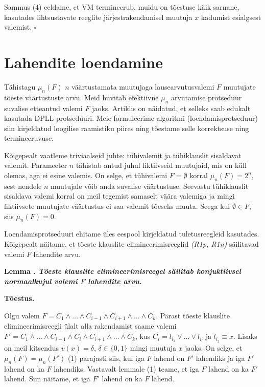 \documentclass[12pt,estonian]{report}
\newcounter{lemma_counter}\setcounter{lemma_counter}{1}
\newcommand{\lemma}[1]{
	\hspace{1cm}\textbf{Lemma \arabic{lemma_counter}\stepcounter{lemma_counter}. \textit{#1}}
}
\newcommand{\proof}[0]{
	\hspace{1cm}\textbf{Tõestus.}
}
\newcommand{\proofend}[0]{\(\square\)}
\newcommand{\proc}[1]{\textsf{#1}}
\begin{document}
Sammus (4) eeldame, et \proc{VM} termineerub, muidu on tõestuse käik
sarnane, kasutades lihtsustavate reeglite järjestrakendamisel muutuja
$x$ kadumist esialgsest valemist. \proofend


\chapter{Lahendite loendamine}

Tähistagu $\mu_{n}(F)$ $n$ väärtustamata muutujaga lausearvutusvalemi $F$ muutujate
tõeste väärtustuste arvu. Meid huvitab efektiivne $\mu_{n}$ arvutamise
protseduur suvalise etteantud valemi $F$ jaoks. Artiklis \cite{key-4}
on näidatud, et selleks saab edukalt kasutada DPLL protseduuri. Meie
formuleerime algoritmi (loendamisprotseduur) siin kirjeldatud loogilise
raamistiku piires ning tõestame selle korrektsuse ning termineeruvuse.

Kõigepealt vaatleme triviaalseid juhte: tühivalemit ja tühiklauslit
sisaldavat valemit. Parameeter $n$ tähistab antud juhul fiktiivseid
muutujaid, mis on küll olemas, aga ei esine valemis. On selge, et
tühivalemi $F=\emptyset$ korral $\mu_{n}(F)={2}^{n}$, sest nendele
$n$ muutujale võib anda suvalise väärtustuse. Seevastu tühiklauslit sisaldava valemi
korral on meil tegemist samaselt väära valemiga ja mingi fiktiivsete
muutujate väärtustus ei saa valemit tõeseks muuta. Seega kui $\emptyset\in F$,
siis $\mu_{n}(F)=0$.

Loendamisprotseduuri ehitame üles eespool kirjeldatud tuletusreegleid
kasutades. Kõigepealt näitame, et tõeste klauslite elimineerimisreeglid
\emph{(R1p, R1n)} säilitavad valemi $F$ lahendite arvu.

\lemma{Tõeste klauslite elimineerimisreegel säilitab
konjuktiivsel normaalkujul valemi $F$ lahendite arvu.}

\proof

Olgu valem $F=C_{1}\wedge\dots\wedge C_{i-1}\wedge C_{i+1}\wedge\dots\wedge C_{k}$.
Pärast tõeste klauslite elimineerimisreegli ülalt alla rakendamist
saame valemi $F'=C_{1}\wedge\dots\wedge C_{i-1}\wedge C_{i}\wedge C_{i+1}\wedge\dots\wedge C_{k}$,
kus $C_{i}=l_{i_{1}}\vee\dots\vee l_{i_{l}}$ ja $l_{i_{j}}\equiv x$.
Lisaks on meil kitsendus $v(x)=\delta$, $\delta\in\{0,1\}$ mingi
muutuja $x$ jaoks. On selge, et $\mu_{n}(F)=\mu_{n}(F')$ (1) parajasti
siis, kui iga $F$ lahend on $F'$ lahendiks ja iga $F'$ lahend on
ka $F$ lahendiks. Vastavalt lemmale (1) teame, et iga $F$ lahend
on ka $F'$ lahend. Siin näitame, et iga $F'$ lahend on ka $F$ lahend.
\end{document}
